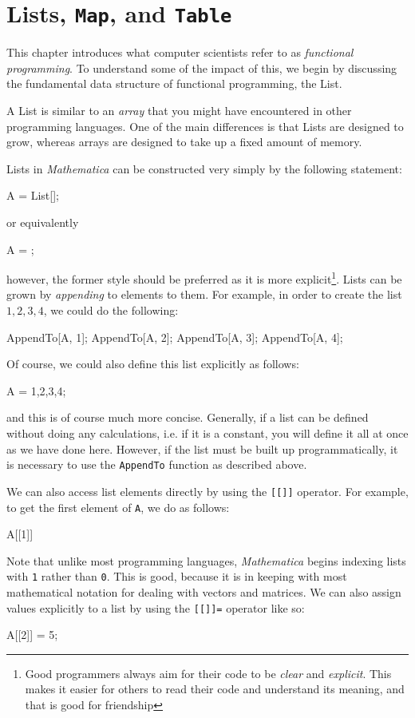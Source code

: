 \chapter{Lists, \texttt{Map}, and \texttt{Table}}
\label{chap:ListsMap}
This chapter introduces what computer scientists refer to as \emph{functional programming}. To understand some of the impact of this, we begin by discussing the fundamental data structure of functional programming, the List.

A List is similar to an \emph{array} that you might have encountered in other programming languages. One of the main differences is that Lists are designed to grow, whereas arrays are designed to take up a fixed amount of memory.

Lists in \emph{Mathematica} can be constructed very simply by the following statement:
\begin{code}
	   A = List[];
\end{code}
or equivalently
\begin{code}
	   A = {};
\end{code}
however, the former style should be preferred as it is more explicit\footnote{Good programmers always aim for their code to be \emph{clear} and \emph{explicit}. This makes it easier for others to read their code and understand its meaning, and that is good for friendship}. Lists can be grown by \emph{appending} to elements to them. For example, in order to create the list $1,2,3,4$, we could do the following:
\begin{code}
	   AppendTo[A, 1];
	   AppendTo[A, 2];
	   AppendTo[A, 3];
	   AppendTo[A, 4];
\end{code}

Of course, we could also define this list explicitly as follows:
\begin{code}
	   A = {1,2,3,4};
\end{code}
and this is of course much more concise. Generally, if a list can be defined without doing any calculations, i.e. if it is a constant, you will define it all at once as we have done here. However, if the list must be built up programmatically, it is necessary to use the \texttt{AppendTo} function as described above.

We can also access list elements directly by using the \texttt{[[]]} operator. For example, to get the first element of \texttt{A}, we do as follows:
\begin{code}
	   A[[1]]
\end{code}
Note that unlike most programming languages, \emph{Mathematica} begins indexing lists with \texttt{1} rather than \texttt{0}. This is good, because it is in keeping with most mathematical notation for dealing with vectors and matrices. We can also assign values explicitly to a list by using the \texttt{[[]]=} operator like so:
\begin{code}
	   A[[2]] = 5;
\end{code}

